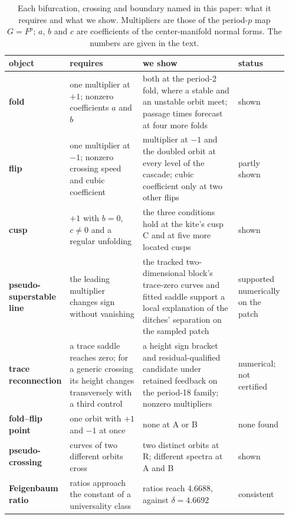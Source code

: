\documentclass[11pt,letterpaper]{article}
\begin{document}
\begin{table}[tbp]
\centering\small
\caption{Each bifurcation, crossing and boundary named in this paper: what it requires and what we show.
Multipliers are those of the period-$p$ map $G=F^p$; $a$, $b$ and $c$ are coefficients of the center-manifold normal
forms. The numbers are given in the text.}
\label{tab:signatures}
\setlength{\tabcolsep}{4pt}
\begin{tabular}{@{}p{0.15\linewidth}p{0.29\linewidth}p{0.38\linewidth}p{0.12\linewidth}@{}}
\toprule
object & requires & we show & status \tabularnewline
\midrule
\raggedright \textbf{fold} & \raggedright one multiplier at $+1$; nonzero coefficients $a$ and $b$ & \raggedright both at the period-2 fold, where a stable and an unstable orbit meet; passage times forecast at four more folds & \raggedright shown \tabularnewline
\raggedright \textbf{flip} & \raggedright one multiplier at $-1$; nonzero crossing speed and cubic coefficient & \raggedright multiplier at $-1$ and the doubled orbit at every level of the cascade; cubic coefficient only at two other flips & \raggedright partly shown \tabularnewline
\raggedright \textbf{cusp} & \raggedright $+1$ with $b=0$, $c\neq0$ and a regular unfolding & \raggedright the three conditions hold at the kite's cusp C and at five more located cusps & \raggedright shown \tabularnewline
\raggedright \textbf{pseudo-superstable line} & \raggedright the leading multiplier changes sign without vanishing & \raggedright the tracked two-dimensional block's trace-zero curves and fitted saddle support a local explanation of the ditches' separation on the sampled patch & \raggedright supported numerically on the patch \tabularnewline
\raggedright \textbf{trace reconnection} & \raggedright a trace saddle reaches zero; for a generic crossing its height changes transversely with a third control & \raggedright a height sign bracket and residual-qualified candidate under retained feedback on the period-18 family; nonzero multipliers & \raggedright numerical; not certified \tabularnewline
\raggedright \textbf{fold--flip point} & \raggedright one orbit with $+1$ and $-1$ at once & \raggedright none at A or B & \raggedright none found \tabularnewline
\raggedright \textbf{pseudo-crossing} & \raggedright curves of two different orbits cross & \raggedright two distinct orbits at R; different spectra at A and B & \raggedright shown \tabularnewline
\raggedright \textbf{Feigenbaum ratio} & \raggedright ratios approach the constant of a universality class & \raggedright ratios reach 4.6688, against $\delta=4.6692$ & \raggedright consistent \tabularnewline

\end{tabular}
\end{table}
\end{document}

